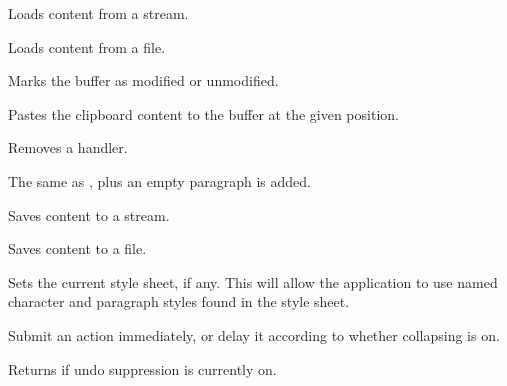 Loads content from a stream.


Loads content from a file.

\label{wxrichtextbuffermodify}


Marks the buffer as modified or unmodified.

\label{wxrichtextbufferpastefromclipboard}


Pastes the clipboard content to the buffer at the given position.

\label{wxrichtextbufferremovehandler}


Removes a handler.

\label{wxrichtextbufferreset}


The same as , plus an empty paragraph is added.

\label{wxrichtextbuffersavefile}


Saves content to a stream.


Saves content to a file.

\label{wxrichtextbuffersetstylesheet}


Sets the current style sheet, if any. This will allow the application to use
named character and paragraph styles found in the style sheet.

\label{wxrichtextbuffersubmitaction}


Submit an action immediately, or delay it according to whether collapsing is on.

\label{wxrichtextbuffersuppressingundo}


Returns \true if undo suppression is currently on.

